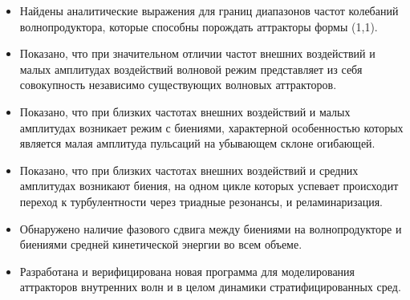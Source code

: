 \begin{itemize}

  \item Найдены аналитические выражения для границ диапазонов частот колебаний волнопродуктора, которые способны порождать аттракторы формы (1,1).

  \item Показано, что при значительном отличии частот внешних воздействий и малых амплитудах воздействий волновой режим представляет из себя совокупность независимо существующих волновых аттракторов.

  \item Показано, что при близких частотах внешних воздействий и малых амплитудах возникает режим с биениями, характерной особенностью которых является малая амплитуда пульсаций на убывающем склоне огибающей.

  \item Показано, что при близких частотах внешних воздействий и средних амплитудах возникают биения, на одном цикле которых успевает происходит переход к турбулентности через триадные резонансы, и реламинаризация.
    
  \item Обнаружено наличие фазового сдвига между биениями на волнопродукторе и биениями средней кинетической энергии во всем объеме.
    

  \item Разработана и верифицирована новая программа для моделирования аттракторов внутренних волн и в целом динамики стратифицированных сред.
    

    
    
    
\end{itemize}


